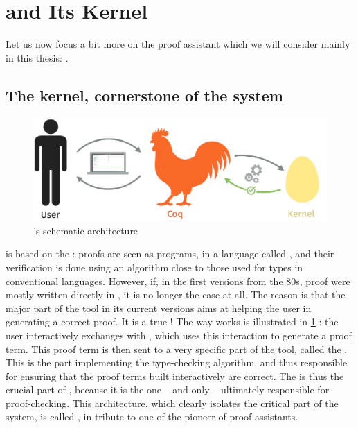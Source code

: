 \section{ and Its Kernel}
\label{sec:intro-coq-en}

Let us now focus a bit more on the proof assistant which we will consider mainly in this
thesis: .

\subsection[The kernel]{The kernel, cornerstone of the system}

\begin{figure}[h]

  \centering
  \includegraphics{./figures/coq-kernel-en.pdf}

  \caption{’s schematic architecture}
  \label{fig:coq-en}
\end{figure}

 is based on the : proofs are seen as programs,
in a language called , and their verification is done using an algorithm
close to those used for types in conventional languages. However, if, in the first versions
from the 80s,  proof were mostly written directly in , it is
no longer the case at all. The reason is that the major part of the tool in its
current versions aims at helping the user in generating a correct proof. It is a true
!
The way  works is illustrated in \cref{fig:coq-en} : the user interactively exchanges
with , which uses this interaction to generate a proof term. This proof term is then
sent to a very specific part of the tool, called the .
This is the part implementing the type-checking algorithm, and thus responsible for ensuring
that the proof terms built interactively are correct.
The  is thus the crucial part of , because it is the one – and only –
ultimately responsible for proof-checking.
This architecture, which clearly isolates the critical part of the system, is called
 , in tribute to one of the pioneer
of proof assistants.

